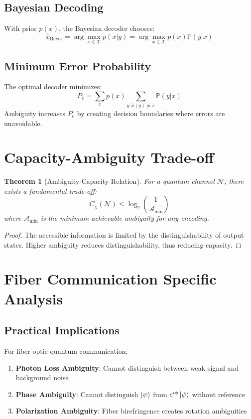 \documentclass[12pt]{article}
\newtheorem{theorem}{Theorem}
\begin{document}
\subsection{Bayesian Decoding}
With prior $p(x)$, the Bayesian decoder chooses:
\[
\hat{x}_{\text{Bayes}} = \arg\max_{x \in \mathcal{X}} p(x|y) = \arg\max_{x \in \mathcal{X}} p(x)\mathbb{P}(y|x)
\]

\subsection{Minimum Error Probability}
The optimal decoder minimizes:
\[
P_e = \sum_{x} p(x) \sum_{y: \hat{x}(y) \neq x} \mathbb{P}(y|x)
\]
Ambiguity increases $P_e$ by creating decision boundaries where errors are unavoidable.

\section{Capacity-Ambiguity Trade-off}

\begin{theorem}[Ambiguity-Capacity Relation]
For a quantum channel $\mathcal{N}$, there exists a fundamental trade-off:
\[
C_{\chi}(\mathcal{N}) \leq \log_2 \left( \frac{1}{\mathcal{A}_{\min}} \right)
\]
where $\mathcal{A}_{\min}$ is the minimum achievable ambiguity for any encoding.
\end{theorem}

\begin{proof}
The accessible information is limited by the distinguishability of output states. Higher ambiguity reduces distinguishability, thus reducing capacity.
\end{proof}

\section{Fiber Communication Specific Analysis}

\subsection{Practical Implications}
For fiber-optic quantum communication:
\begin{enumerate}
    \item \textbf{Photon Loss Ambiguity}: Cannot distinguish between weak signal and background noise
    \item \textbf{Phase Ambiguity}: Cannot distinguish $\ket{\psi}$ from $e^{i\phi}\ket{\psi}$ without reference
    \item \textbf{Polarization Ambiguity}: Fiber birefringence creates rotation ambiguities
\end{enumerate}
\end{document}
